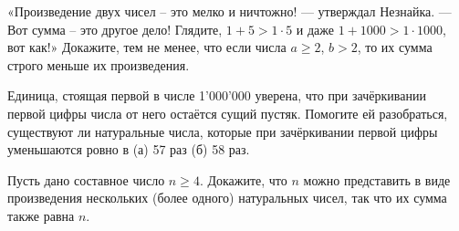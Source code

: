 ﻿
\begin{itemize}

\itA «Произведение двух чисел – это мелко и ничтожно! — утверждал Незнайка. — Вот сумма – это другое дело! Глядите, $1+5 > 1 \cdot 5$ и даже $1+1000 > 1 \cdot 1000$, вот как!» Докажите, тем не менее, что если числа $a \ge 2$, $b > 2$, то их сумма строго меньше их произведения.

\itB Единица, стоящая первой в числе 1'000'000 уверена, что при зачёркивании первой цифры числа от него остаётся сущий пустяк. Помогите ей разобраться, существуют ли натуральные числа, которые при зачёркивании первой цифры уменьшаются ровно в (а) 57 раз (б) 58 раз.

\itC Пусть дано составное число $n \geq 4$. Докажите, что $n$ можно представить в виде произведения нескольких (более одного) натуральных чисел, так что их сумма также равна $n$.
\end{itemize}